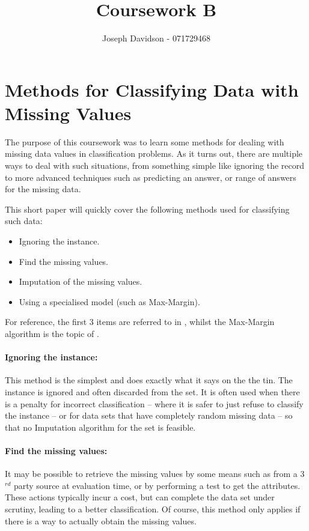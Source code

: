 \documentclass[10pt]{article}
\title{Coursework B}
\author{Joseph Davidson - 071729468}
\date{}
\begin{document}
  \maketitle
  
  \section{Methods for Classifying Data with Missing Values }

  The purpose of this coursework was to learn some methods for dealing with missing data values
  in classification problems. As it turns out, there are multiple ways to deal with such situations,
  from something simple like ignoring the record to more advanced techniques such as predicting an
  answer, or range of answers for the missing data.\newline
 
  This short paper will quickly cover the following methods used for classifying such data:   

  \begin{itemize}
    \setlength{\itemsep}{1pt}
    \setlength{\parskip}{0pt}
    \setlength{\parsep}{0pt}
    \item Ignoring the instance.
    \item Find the missing values.
    \item Imputation  of the missing values.
    \item Using a specialised model (such as Max-Margin).
  \end{itemize}

  For reference, the first 3 items are referred to in \cite{1314553}, whilst the Max-Margin algorithm is the topic of \cite{citeulike:4732435}.

  \paragraph{Ignoring the instance: } This method is the simplest and does exactly what it says on the the tin.
    The instance is ignored and often discarded from the set. It is often used when there is a penalty for
    incorrect classification -- where it is safer to just refuse to classify the instance -- or for data sets that
    have completely random missing data -- so that no Imputation algorithm for the set is feasible.

  \paragraph{Find the missing values: } It may be possible to retrieve the missing values by some means such as
    from a 3$^{rd}$ party source at evaluation time, or by performing a test to get the attributes. These actions typically
    incur a cost, but can complete the data set under scrutiny, leading to a better classification. Of course, this method
    only applies if there is a way to actually obtain the missing values.
\end{document}
